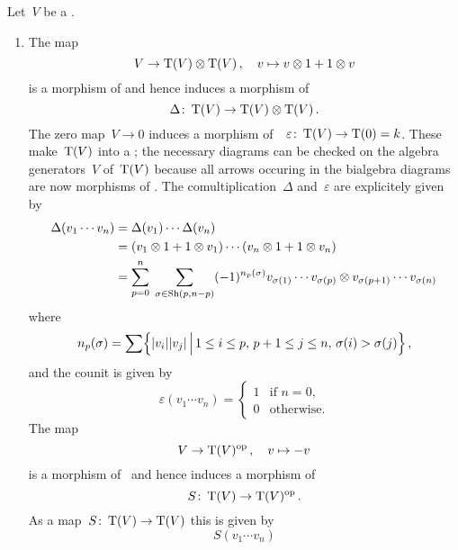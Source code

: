 \documentclass[a4paper,10pt,headings=standardclasses]{scrartcl}
\begin{document}
\begin{example}
  Let~$V$ be a {\dgv}.
  \begin{enumerate}
    \item
      The map
      \[
        V
        \to
        \operatorname{T}(V) \otimes \operatorname{T}(V) \,,
        \quad
        v
        \mapsto
        v \otimes 1 + 1 \otimes v
      \]
      is a morphism of {\dgv} and hence induces a morphism of~{\dgas}
      \[
        \Delta
        \colon
        \operatorname{T}(V)
        \to
        \operatorname{T}(V) \otimes \operatorname{T}(V) \,.
      \]
      The zero map~$V \to 0$ induces a morphism of~{\dgas}~$\varepsilon \colon \operatorname{T}(V) \to \operatorname{T}(0) = k$.
      These make~$\operatorname{T}(V)$ into a {\dgb};
      the necessary diagrams can be checked on the algebra generators~$V$ of~$\operatorname{T}(V)$ because all arrows occuring in the bialgebra diagrams are now morphisms of {\dgas}.
      The comultiplication~$\Delta$ and~$\varepsilon$ are explicitely given by
      \begin{align*}
        \Delta(v_1 \dotsm v_n)
        &=
        \Delta(v_1) \dotsm \Delta(v_n)
        \\
        &=
        (v_1 \otimes 1 + 1 \otimes v_1)
        \dotsm
        (v_n \otimes 1 + 1 \otimes v_n)
        \\
        &=
        \sum_{p=0}^n
        \;
        \sum_{\sigma \in \operatorname{Sh}(p,n-p)}
        (-1)^{n_p(\sigma)}
        v_{\sigma(1)} \dotsm v_{\sigma(p)}
        \otimes
        v_{\sigma(p+1)} \dotsm v_{\sigma(n)}
      \end{align*}
      where
      \[
        n_p(\sigma)
        =
        \sum
        \Bigl\{
          \hdeg{v_i} \hdeg{v_j}
        \suchthat[\Big]
          1 \leq i \leq p, \,
          p+1 \leq j \leq n, \,
          \sigma(i) > \sigma(j)
        \Bigr\} \,,
      \]
      and the counit is given by
      \[
        \varepsilon( v_1 \dotsm v_n )
        =
        \begin{cases}
          1 & \text{if~$n = 0$}, \\
          0 & \text{otherwise}.
        \end{cases}
      \]
      The map
      \[
        V
        \to
        \operatorname{T}(V)^{\mathrm{op}} \,,
        \quad
        v
        \mapsto
        -v
      \]
      is a morphism of~{\dgvs} and hence induces a morphism of {\dgas}
      \[
        S
        \colon
        \operatorname{T}(V)
        \to
        \operatorname{T}(V)^{\mathrm{op}} \,.
      \]
      As a map~$S \colon \operatorname{T}(V) \to \operatorname{T}(V)$ this is given by
      \[
        S(v_1 \dotsm v_n)
\]
\end{enumerate}
\end{example}
\end{document}
